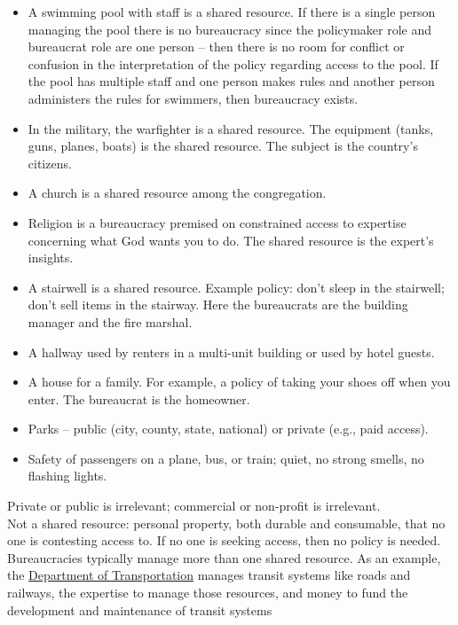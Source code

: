 {{\begin{itemize}
\item A swimming pool with staff is a shared resource. If there is a single person managing the pool there is no bureaucracy since the \gls{policymaker} role and bureaucrat role are one person -- then there is no room for conflict or confusion in the interpretation of the policy regarding access to the pool. If the pool has multiple staff and one person makes rules and another person administers the rules for swimmers, then bureaucracy exists.
\item In the military, the warfighter is a shared resource. The equipment (tanks, guns, planes, boats) is the shared resource. The subject is the country's citizens. 
\item A church is a shared resource among the congregation.
\item Religion is a bureaucracy premised on constrained access to expertise concerning what God wants you to do. The shared resource is the expert's insights.
\item A stairwell is a shared resource. Example policy: don't sleep in the stairwell; don't sell items in the stairway. Here the bureaucrats are the building manager and the fire marshal. 
\item A hallway used by renters in a multi-unit building or used by hotel guests.
\item A house for a family. For example, a policy of taking your shoes off when you enter. The bureaucrat is the homeowner.
\item Parks -- public (city, county, state, national) or private (e.g., paid access). 
\item Safety of passengers on a plane, bus, or train; quiet, no strong smells, no flashing lights.
\end{itemize}
Private or public is irrelevant; commercial or non-profit is irrelevant. \\
Not a shared resource: personal property, both durable and consumable, that no one is contesting access to. If no one is seeking access, then no policy is needed. \\
Bureaucracies typically manage more than one shared resource.
As an example, the \href{https://en.wikipedia.org/wiki/Department_of_transportation}{Department of Transportation}
manages  transit systems like roads and railways, the expertise to manage those resources, and money to fund the development and maintenance of transit systems}
}

